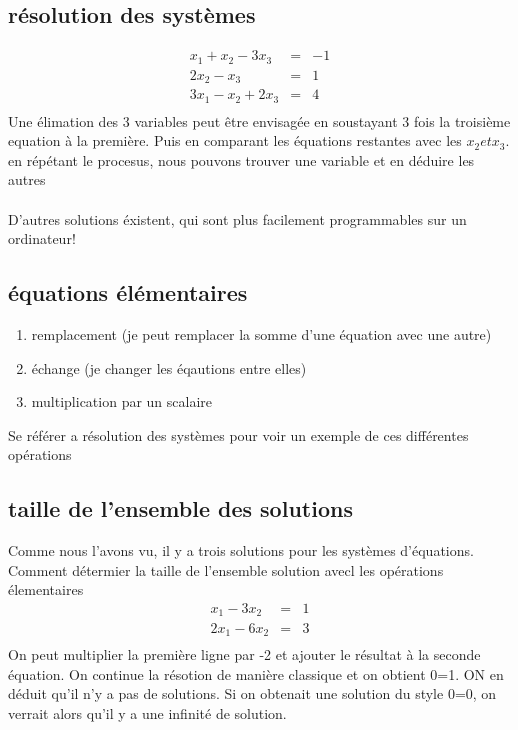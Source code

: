 \documentclass[a4paper,10pt]{article}
\begin{document}
\subsection{résolution des systèmes}

\begin{eqnarray}
 x_1+x_2-3x_3 & = & -1\\
 2x_2-x_3 & = & 1\\
 3x_1-x_2+2x_3 & = & 4\\
\end{eqnarray}
Une élimation des 3 variables peut être envisagée en soustayant 3 fois la troisième equation à la première. Puis en comparant les équations restantes avec les $x_2 et x_3$. en répétant le procesus, nous pouvons trouver une variable et en déduire les autres
\paragraph{}
D'autres solutions éxistent, qui sont plus facilement programmables sur un ordinateur! 

\subsection{équations élémentaires}
\begin{enumerate}
 \item remplacement (je peut remplacer la somme d'une équation avec une autre)
 \item échange (je changer les éqautions entre elles)
 \item multiplication par un scalaire
\end{enumerate}
Se référer a résolution des systèmes pour voir un exemple de ces différentes opérations

\subsection{taille de l'ensemble des solutions}
 Comme nous l'avons vu, il y a trois solutions pour les systèmes d'équations. Comment détermier la taille de l'ensemble solution avecl les opérations élementaires
 \begin{eqnarray}
  x_1-3x_2 & = & 1\\
  2x_1-6x_2 & = & 3\\
 \end{eqnarray}
On peut multiplier la première ligne par -2 et ajouter le résultat à la seconde équation. On continue la résotion de manière classique et on obtient 0=1. ON en déduit qu'il n'y a pas de solutions. Si on obtenait une solution du style 0=0, on verrait alors qu'il y a une 
infinité de solution.
\end{document}
